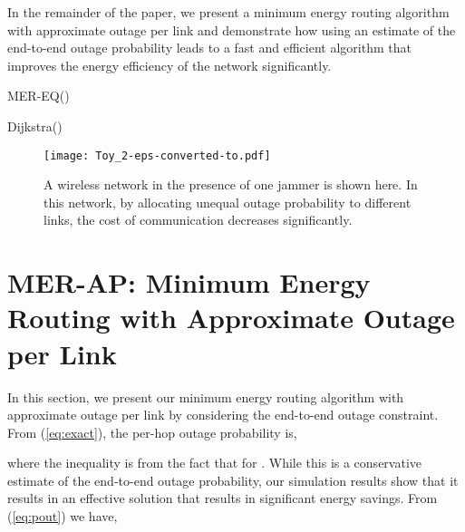 \documentclass[10pt,journal]{IEEEtran}
\theoremstyle{definition}
\begin{document}
In the remainder of the paper, we present a minimum energy routing algorithm with approximate outage per link and demonstrate how using an estimate of the end-to-end outage probability  leads to a fast and efficient algorithm that  improves the energy efficiency of the network significantly.
\begin{algorithm}[t]
\caption{MER-EQ()}
\renewcommand{\algorithmiccomment}[1]{/*~#1~*/}
\begin{algorithmic}[1]
    \FOR{ \TO }
        
        \STATE {}
        \FORALL{}
            \STATE 
        \ENDFOR
        
        \STATE{}
        \STATE  Dijkstra()
				\STATE{}
        
    \ENDFOR
    
    \STATE{}
    \STATE 
    \RETURN 
\end{algorithmic}
\label{a:routing}
\end{algorithm}

\begin{figure}
\begin{center}
	\texttt{[image: Toy\_2-eps-converted-to.pdf]}
 \end{center}
 \caption{A wireless network in the presence of one jammer is shown here. In this network, by allocating unequal outage probability to different links, the cost  of communication decreases significantly. }
 \label{fig:toy}
 \end{figure}
 \vspace{-8pt}
\section{MER-AP: Minimum Energy Routing with Approximate Outage per Link}\label{sec:proposed}
In this section, we present our minimum energy routing algorithm with approximate outage per link  by considering the end-to-end outage constraint.
From (\ref{eq:exact}), the per-hop outage probability   is,
\vspace{-6pt}

where the inequality is from the fact that  for  .
 While this is a conservative estimate of the end-to-end outage probability, our simulation results show that it results in an effective solution that results in significant energy savings. 
From (\ref{eq:pout}) we have,
\end{document}
